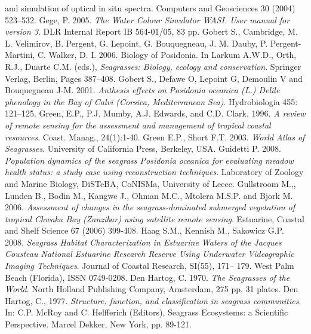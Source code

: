 \documentclass[10pt, a4paper]{article}
\begin{document}
\begin{thebibliography}{999}
{and simulation of optical in situ spectra}. Computers and Geosciences 30 (2004) 523–532. \pageref{Gege04}
Gege, P. 2005. \emph{The Water Colour Simulator WASI. User manual for version 3}. DLR
Internal Report IB 564-01/05, 83 pp. \pageref{Gege05}
Gobert S., Cambridge, M. L. Velimirov, B. Pergent, G. Lepoint, G. Bouquegneau, J. M.
Dauby, P. Pergent-Martini, C. Walker, D. I. 2006. Biology of Posidonia. In Larkum A.W.D.,
Orth, R.J., Duarte C.M. (eds.), \emph{Seagrasses: Biology, ecology and conservation}. Springer
Verlag, Berlin, Pages 387–408. \pageref{Gobert06}
Gobert S., Defawe O, Lepoint G, Demoulin V and Bouquegneau J-M. 2001. \emph{Anthesis
effects on \textit{Posidonia oceanica} (L.) Delile phenology in the Bay of Calvi (Corsica,
Mediterranean Sea)}. Hydrobiologia 455: 121–125. \pageref{Gobert01}
Green, E.P., P.J. Mumby, A.J. Edwards, and C.D. Clark, 1996. \emph{A review of remote
sensing for the assessment and management of tropical coastal resources}. Coast. Manag.,
24(1):1-40. \pageref{Green96}
Green E.P., Short F.T. 2003. \emph{World Atlas of Seagrasses}. University of California Press,
Berkeley, USA. \pageref{Green03}
Guidetti P. 2008. \emph{Population dynamics of the seagrass \textit{Posidonia oceanica} for
evaluating meadow health status: a study case using reconstruction techniques}. Laboratory
of Zoology and Marine Biology, DiSTeBA, CoNISMa, University of Lecce. \pageref{Guidetti08}
Gullstroom M.,, Lunden B., Bodin M., Kangwe J., Ohman M.C., Mtolera M.S.P. and
Bjork M. 2006. \emph{Assessment of changes in the seagrass-dominated submerged vegetation of
tropical Chwaka Bay (Zanzibar) using satellite remote sensing}. Estuarine, Coastal and Shelf
Science 67 (2006) 399-408. \pageref{Gullstroom06}
Haag S.M., Kennish M., Sakowicz G.P. 2008. \emph{Seagrass Habitat Characterization in
Estuarine Waters of the Jacques Cousteau National Estuarine Research Reserve Using
Underwater Videographic Imaging Techniques}. Journal of Coastal Research, SI(55), 171–
179. West Palm Beach (Florida), ISSN 0749-0208. \pageref{Haag08}
Den Hartog, C. 1970. \emph{The Seagrasses of the World}. North Holland Publishing Company,
Amsterdam, 275 pp. 31 plates. \pageref{DenHartog70}
Den Hartog, C., 1977. \emph{Structure, function, and classification in seagrass communities}.
In: C.P. McRoy and C. Helfferich (Editors), Seagrass Ecosystems: a Scientific Perspective.
Marcel Dekker, New York, pp. 89-121. \pageref{DenHartog77}

\end{thebibliography}
\end{document}
